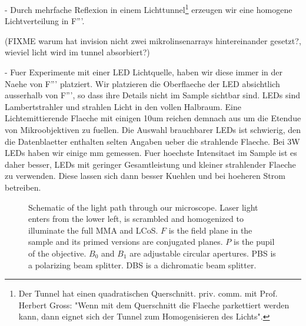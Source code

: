  - Durch mehrfache Reflexion in einem Lichttunnel\footnote{Der Tunnel
   hat einen quadratischen Querschnitt. priv. comm. mit Prof. Herbert
   Gross: "Wenn mit dem Querschnitt die Flaeche parkettiert werden
   kann, dann eignet sich der Tunnel zum Homogenisieren des Lichts".}
   erzeugen wir eine homogene Lichtverteilung in F'''. 
   
   (FIXME warum hat invision nicht zwei mikrolinsenarrays
   hintereinander gesetzt?, wieviel licht wird im tunnel absorbiert?)

 - Fuer Experimente mit einer LED Lichtquelle, haben wir diese immer
   in der Naehe von F''' platziert. Wir platzieren die Oberflaeche der
   LED absichtlich ausserhalb von F''', so dass ihre Details nicht im
   Sample sichtbar sind. LEDs sind Lambertstrahler und strahlen Licht
   in den vollen Halbraum. Eine Lichtemittierende Flaeche mit einigen
   10um reichen demnach aus um die Etendue von Mikroobjektiven zu
   fuellen. Die Auswahl brauchbarer LEDs ist schwierig, den die
   Datenblaetter enthalten selten Angaben ueber die strahlende
   Flaeche. Bei 3W LEDs haben wir einige mm gemessen. Fuer hoechste
   Intensitaet im Sample ist es daher besser, LEDs mit geringer
   Gesamtleistung und kleiner strahlender Flaeche zu verwenden. Diese
   lassen sich dann besser Kuehlen und bei hoeheren Strom betreiben.


\begin{figure}[!htbp]
  \centering
  \caption{Schematic of the light path through our microscope. Laser
    light enters from the lower left, is scrambled and homogenized to
    illuminate the full MMA and LCoS. $F$ is the field plane in the
    sample and its primed versions are conjugated planes. $P$ is the
    pupil of the objective. $B_0$ and $B_1$ are adjustable circular
    apertures. PBS is a polarizing beam splitter. DBS is a dichromatic
    beam splitter.}
  \label{fig:memi-real}
\end{figure}







